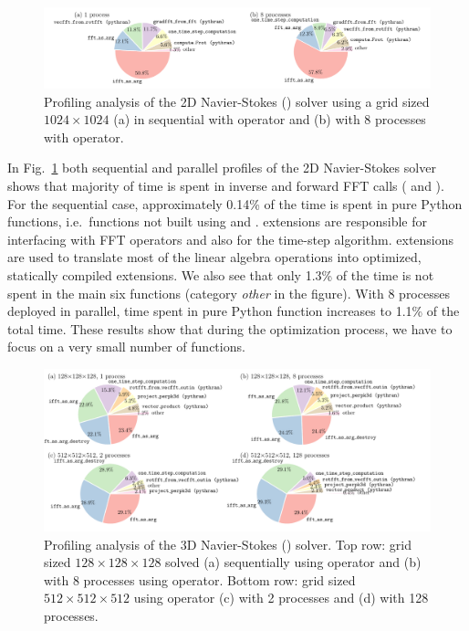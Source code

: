 \documentclass{../jors}
\begin{document}

\begin{figure}[htp]
\centering
\includegraphics[width=\linewidth]{tmp/fig_profile2d}
\caption{Profiling analysis of the 2D Navier-Stokes
() solver using a grid sized $1024\times1024$
(a) in sequential with  operator and (b) with 8
processes with 
operator.}\label{fig:profile2d}
\end{figure}

In Fig.~\ref{fig:profile2d} both sequential and parallel profiles of the 2D
Navier-Stokes solver shows that majority of time is spent in inverse and forward
FFT calls ( and ). For the
sequential case, approximately 0.14\% of the time is spent in pure Python
functions, i.e.\ functions not built using  and .
%
 extensions are responsible for interfacing with FFT operators and
also for the time-step algorithm.   extensions are used to translate
most of the linear algebra operations into optimized, statically compiled
extensions.
%
We also see that only 1.3\% of the time is not spent in the main six functions
(category \emph{other} in the figure).
%
With 8 processes deployed in parallel, time spent in pure Python function
increases to 1.1\% of the total time.
%
These results show that during the optimization process, we have to focus on a
very small number of functions.

\begin{figure}[htp]
\centering
\includegraphics[width=\linewidth]{tmp/fig_profile3d}
\caption{Profiling analysis of the 3D Navier-Stokes
() solver.
%
Top row: grid sized $128\times128\times128$ solved (a) sequentially using
 operator and (b) with 8 processes using
 operator.
%
Bottom row: grid sized $512\times512\times512$ using
 operator (c) with 2 processes and
(d) with 128 processes.}
\label{fig:profile3d}
\end{figure}
\end{document}
